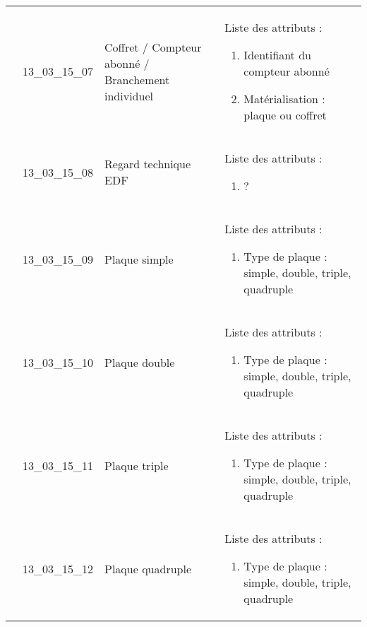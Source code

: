 \documentclass[12pt,titlepage]{book}
\begin{document}
\begin{supertabular}{|p{10cm}|c|p{13cm}|p{12cm}|}
                    & 13\_03\_15\_07 & Coffret / Compteur abonné / Branchement individuel & Liste des attributs :
\begin{enumerate}
  \item Identifiant du compteur abonné  \item Matérialisation : plaque ou coffret\end{enumerate}
\\


                    & 13\_03\_15\_08 & Regard technique EDF & Liste des attributs :
\begin{enumerate}
  \item ?\end{enumerate}
\\


                    & 13\_03\_15\_09 & Plaque simple & Liste des attributs :
\begin{enumerate}
  \item Type de plaque : simple, double, triple, quadruple\end{enumerate}
\\


                    & 13\_03\_15\_10 & Plaque double & Liste des attributs :
\begin{enumerate}
  \item Type de plaque : simple, double, triple, quadruple\end{enumerate}
\\


                    & 13\_03\_15\_11 & Plaque triple & Liste des attributs :
\begin{enumerate}
  \item Type de plaque : simple, double, triple, quadruple\end{enumerate}
\\


                    & 13\_03\_15\_12 & Plaque quadruple & Liste des attributs :
\begin{enumerate}
  \item Type de plaque : simple, double, triple, quadruple\end{enumerate}
\\
\hline
\end{supertabular}
\end{document}
